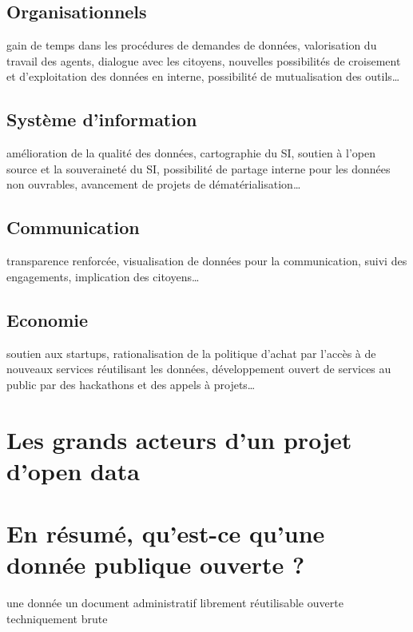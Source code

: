 \documentclass[]{book}
\theoremstyle{definition}
\theoremstyle{definition}
\theoremstyle{definition}
\theoremstyle{remark}
\begin{document}
\subsection{Organisationnels}\label{organisationnels}

gain de temps dans les procédures de demandes de données, valorisation
du travail des agents, dialogue avec les citoyens, nouvelles
possibilités de croisement et d'exploitation des données en interne,
possibilité de mutualisation des outils\ldots{}

\subsection{Système d'information}\label{systeme-dinformation}

amélioration de la qualité des données, cartographie du SI, soutien à
l'open source et la souveraineté du SI, possibilité de partage interne
pour les données non ouvrables, avancement de projets de
dématérialisation\ldots{}

\subsection{Communication}\label{communication}

transparence renforcée, visualisation de données pour la communication,
suivi des engagements, implication des citoyens\ldots{}

\subsection{Economie}\label{economie}

soutien aux startups, rationalisation de la politique d'achat par
l'accès à de nouveaux services réutilisant les données, développement
ouvert de services au public par des hackathons et des appels à
projets\ldots{}

\section{Les grands acteurs d'un projet d'open
data}\label{les-grands-acteurs-dun-projet-dopen-data}

\section{En résumé, qu'est-ce qu'une donnée publique ouverte
?}\label{en-resume-quest-ce-quune-donnee-publique-ouverte}

une donnée un document administratif librement réutilisable ouverte
techniquement brute
\end{document}
